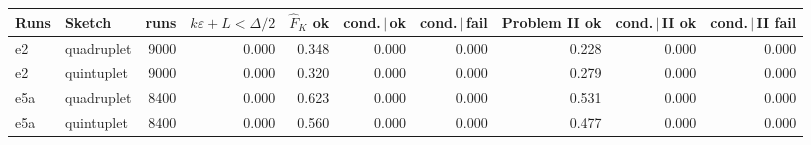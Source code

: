 \begin{tabular}{llrrrrrrrr}
\hline
Runs & Sketch & runs & $k\varepsilon + L < \Delta/2$ & $\hat F_K$ ok & cond.\,$|$\,ok & cond.\,$|$\,fail & Problem II ok & cond.\,$|$\,II ok & cond.\,$|$\,II fail \\
\hline
e2 & quadruplet & 9000 & 0.000 & 0.348 & 0.000 & 0.000 & 0.228 & 0.000 & 0.000 \\
e2 & quintuplet & 9000 & 0.000 & 0.320 & 0.000 & 0.000 & 0.279 & 0.000 & 0.000 \\
e5a & quadruplet & 8400 & 0.000 & 0.623 & 0.000 & 0.000 & 0.531 & 0.000 & 0.000 \\
e5a & quintuplet & 8400 & 0.000 & 0.560 & 0.000 & 0.000 & 0.477 & 0.000 & 0.000 \\
\hline
\end{tabular}
